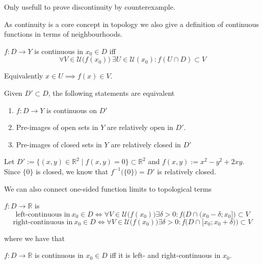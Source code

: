 \begin{remark}[Tips]
   Only usefull to prove discontinuity by counterexample.
\end{remark}
As continuity is a core concept in topology we also give a definition of continuous functions in terms of neighbourhoods.
\begin{definition}\label{def:neigh_cont}
   \(f: D \to Y\) is continuous in \(x_0 \in D\) iff
   \[\forall V \in \mathcal{U}\big(f(x_0)\big)~\exists U \in \mathcal{U}(x_0): f(U \cap D) \subset V\]
\end{definition}
\begin{remark}
   Equivalently \(x \in U \implies f(x) \in V\).
\end{remark}

\begin{theorem}
   Given \(D' \subset D\), the following statements are equivalent
   \begin{enumerate}[label=\roman*, align=Center]
      \item \(f: D \to Y\) is continuous on \(D'\)
      \item Pre-images of open sets in \(Y\) are relatively open in \(D'\).
      \item Pre-images of closed sets in \(Y\) are relatively closed in \(D'\)
   \end{enumerate}
\end{theorem}
\begin{example}
   Let \(D' := \{(x, y) \in \mathbb{R}^2 \mid f(x,y) = 0\} \subset \mathbb{R}^2\) and \(f(x,y) := x^2-y^2 + 2xy\).
   Since \(\{0\}\) is closed, we know that \(f^{-1}\big(\{0\}\big) = D'\) is relatively closed.
\end{example}
We can also connect one-sided function limits to topological terms
\begin{definition}
   \(f: D \to \mathbb{R}\) is
   \[\text{left-continuous in}~x_0 \in D \iff \forall V \in \mathcal{U}\big(f(x_0)\big) \exists \delta > 0: f\big(D \cap (x_0 - \delta; x_0]\big) \subset V\]
   \[\text{right-continuous in}~x_0 \in D \iff \forall V \in \mathcal{U}\big(f(x_0)\big) \exists \delta > 0: f\big(D \cap [x_0; x_0 + \delta)\big) \subset V\]
\end{definition}
where we have that
\begin{proposition}
   \(f: D \to \mathbb{R}\) is continuous in \(x_0 \in D\) iff it is left- and right-continuous in \(x_0\).
\end{proposition}

